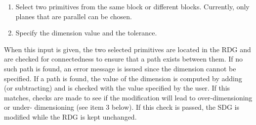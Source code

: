\begin{enumerate}
                    \begin{enumerate}
                    \item
                    Select two primitives from the same block or different 
					blocks.
                    Currently, only planes that are parallel can be 
					chosen.
                    \item
                    Specify the dimension value and the tolerance.

                    \end{enumerate}

                    When this input is given, the two selected primitives are 
					located in the RDG and are checked for connectedness to
					ensure that a path exists between them. If no such path is
                    found, an error message is issued since the dimension 
					cannot be specified. If a path is found, the value of the
					dimension is computed by adding (or subtracting)
                    and is checked with the value specified by the
                    user. If this matches, checks are made to see if the
					modification will lead to over-dimensioning or under-
					dimensioning (see item 3 below). If this check is passed, 
					the SDG is modified while the RDG is kept unchanged.


\end{enumerate}
